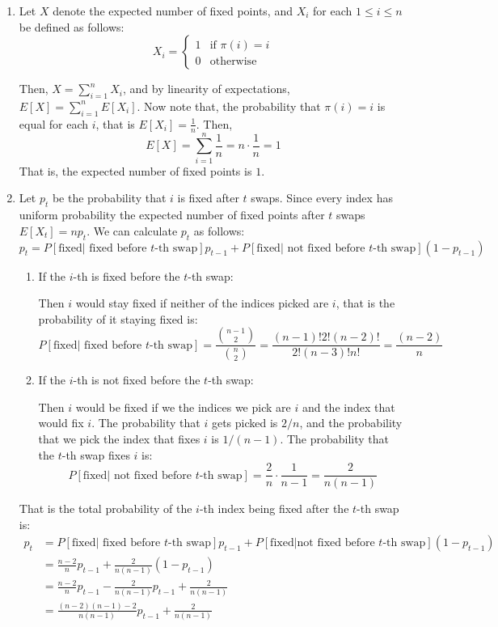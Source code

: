 \documentclass[12pt]{article}
\begin{document}
\begin{solution}
    \bbni
    \begin{enumerate}
        \item Let $X$ denote the expected number of fixed points, and $X_i$ for each $1 \leq i \leq n$ be defined as follows: 
        \[X_i = \begin{cases*}
            1 & \text{if $\pi(i) = i$} \\ 
            0 & \text{otherwise}
        \end{cases*}\]

        Then, $X = \sum_{i=1}^{n}X_i$, and by linearity of expectations, $E[X] = \sum_{i=1}^{n}E[X_i]$. Now note that, the probability that $\pi(i) = i$ is equal for each $i$, that is $E[X_i] = \frac{1}{n}$. 
        Then, 
        \[E[X] = \sum_{i=1}^{n} \frac{1}{n} = n \cdot \frac{1}{n} = 1\]
        That is, the expected number of fixed points is $1$. 

        \item 
        Let $p_t$ be the probability that $i$ is fixed after $t$ swaps. Since every index has uniform probability the expected number of fixed points after $t$ swaps $E[X_t] = np_t$. We can calculate $p_t$ as follows: 
        \[p_t = P[\text{fixed$|$ fixed before $t$-th swap}]p_{t-1} +  P[\text{fixed$|$ not fixed before $t$-th swap}](1-p_{t-1}) \]
        \begin{enumerate}
            \item If the $i$-th is fixed before the $t$-th swap: 
            
             Then $i$ would stay fixed if neither of the indices picked are $i$, that is the probability of it staying fixed is: 
             \[P[\text{fixed$|$ fixed before $t$-th swap}] = \frac{\binom{n-1}{2}}{\binom{n}{2}} = \frac{(n-1)!2! (n-2)!}{2! (n-3)! n!} = \frac{(n-2)}{n}\]

            \item If the $i$-th is not fixed before the $t$-th swap: 

            Then $i$ would be fixed if we the indices we pick are $i$ and the index that would fix $i$. The probability that $i$ gets picked is $2/n$, and the probability that we pick the index that fixes $i$ is $1/(n-1)$. The probability that the $t$-th swap fixes $i$ is: 
            \[P[\text{fixed$|$ not fixed before $t$-th swap}] = \frac{2}{n} \cdot \frac{1}{n-1} = \frac{2}{n(n-1)}\]
        \end{enumerate}

        That is the total probability of the $i$-th index being fixed after the $t$-th swap is: 
        \begin{align*}
            p_t &= P[\text{fixed$|$ fixed before $t$-th swap}]p_{t-1} +  P[\text{fixed$|$not fixed before $t$-th swap}](1-p_{t-1}) \\ 
            &=\frac{n-2}{n}p_{t-1} + \frac{2}{n(n-1)}(1- p_{t-1})  \\ 
            &= \frac{n-2}{n}p_{t-1} - \frac{2}{n(n-1)}p_{t-1} + \frac{2}{n(n-1)} \\ 
            &= \frac{(n-2)(n-1) - 2 }{n(n-1)} p_{t-1} + \frac{2}{n(n-1)}
        \end{align*}
        

\end{enumerate}
\end{solution}
\end{document}
